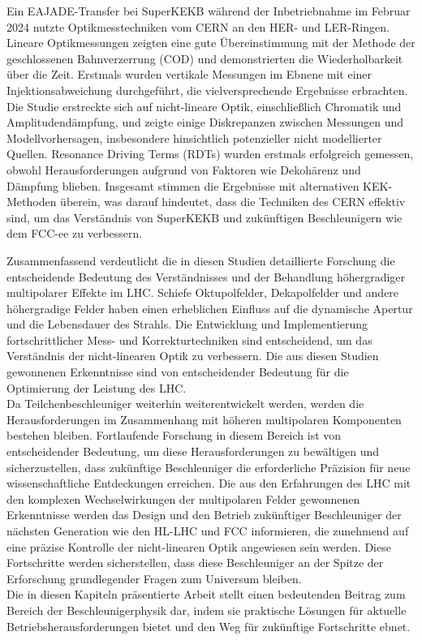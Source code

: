 {%
Ein EAJADE-Transfer bei SuperKEKB während der Inbetriebnahme im Februar 2024 nutzte
Optikmesstechniken vom CERN an den HER- und LER-Ringen. Lineare Optikmessungen zeigten eine gute
Übereinstimmung mit der Methode der geschlossenen Bahnverzerrung (COD) und demonstrierten die
Wiederholbarkeit über die Zeit. Erstmals wurden vertikale Messungen im Ebnene mit einer
Injektionsabweichung durchgeführt, die vielversprechende Ergebnisse erbrachten. Die Studie
erstreckte sich auf nicht-lineare Optik, einschließlich Chromatik und Amplitudendämpfung, und zeigte
einige Diskrepanzen zwischen Messungen und Modellvorhersagen, insbesondere hinsichtlich potenzieller
nicht modellierter Quellen. Resonance Driving Terms (RDTs) wurden erstmals erfolgreich gemessen,
obwohl Herausforderungen aufgrund von Faktoren wie Dekohärenz und Dämpfung blieben. Insgesamt
stimmen die Ergebnisse mit alternativen KEK-Methoden überein, was darauf hindeutet, dass die
Techniken des CERN effektiv sind, um das Verständnis von SuperKEKB und zukünftigen Beschleunigern
wie dem FCC-ee zu verbessern.

Zusammenfassend verdeutlicht die in diesen Studien detaillierte Forschung die entscheidende
Bedeutung des Verständnisses und der Behandlung höhergradiger multipolarer Effekte im LHC. Schiefe
Oktupolfelder, Dekapolfelder und andere höhergradige Felder haben einen erheblichen Einfluss auf die
dynamische Apertur und die Lebensdauer des Strahls. Die Entwicklung und Implementierung
fortschrittlicher Mess- und Korrekturtechniken sind entscheidend, um das Verständnis der
nicht-linearen Optik zu verbessern. Die aus diesen Studien gewonnenen Erkenntnisse sind von
entscheidender Bedeutung für die Optimierung der Leistung des LHC.
\\
\indent Da Teilchenbeschleuniger weiterhin weiterentwickelt werden, werden die Herausforderungen im
Zusammenhang mit höheren multipolaren Komponenten bestehen bleiben. Fortlaufende Forschung in diesem
Bereich ist von entscheidender Bedeutung, um diese Herausforderungen zu bewältigen und
sicherzustellen, dass zukünftige Beschleuniger die erforderliche Präzision für neue
wissenschaftliche Entdeckungen erreichen. Die aus den Erfahrungen des LHC mit den komplexen
Wechselwirkungen der multipolaren Felder gewonnenen Erkenntnisse werden das Design und den Betrieb
zukünftiger Beschleuniger der nächsten Generation wie den HL-LHC und FCC informieren, die zunehmend
auf eine präzise Kontrolle der nicht-linearen Optik angewiesen sein werden. Diese Fortschritte
werden sicherstellen, dass diese Beschleuniger an der Spitze der Erforschung grundlegender Fragen
zum Universum bleiben.
\\
\indent Die in diesen Kapiteln präsentierte Arbeit stellt einen bedeutenden Beitrag zum Bereich der
Beschleunigerphysik dar, indem sie praktische Lösungen für aktuelle Betriebsherausforderungen bietet
und den Weg für zukünftige Fortschritte ebnet.


}